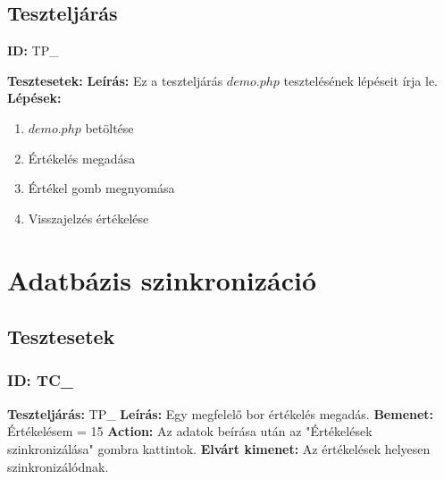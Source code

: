 \documentclass[12pt]{report}
\theoremstyle{definition}
\begin{document}
	\setcounter{TPTCStop}{\value{TC}}
	\subsection{Teszteljárás}
	
	\textbf{ID:}  TP\_\addtocounter{TP}{1}
	\newline
	\textbf{Tesztesetek:} 
	\newline
	\textbf{Leírás:} Ez a teszteljárás $demo.php$ tesztelésének lépéseit írja le.
	\newline
	\textbf{Lépések:}
	\begin{enumerate}
		\item $demo.php$ betöltése
		\item Értékelés megadása
		\item Értékel gomb megnyomása
		\item Visszajelzés értékelése 
	\end{enumerate}
	
	
	
	\section{Adatbázis szinkronizáció}
	
	
	
	\subsection{Tesztesetek}
	\setcounter{TPTCStart}{\value{TC}}
	
	\subsubsection{ID: TC\_}\addtocounter{TC}{1}
	\textbf{Teszteljárás:} TP\_
	\newline 
	\textbf{Leírás:} Egy megfelelő bor értékelés megadás.
	\newline 
	\textbf{Bemenet:} Értékelésem = 15
	\newline 
	\textbf{Action:} Az adatok beírása után az "Értékelések szinkronizálása" gombra kattintok.
	\newline 
	\textbf{Elvárt kimenet:} Az értékelések helyesen szinkronizálódnak.
	
\end{document}
